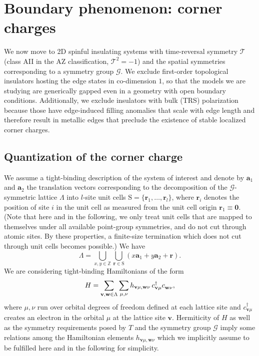 \section{Boundary phenomenon: corner charges}
\label{sec:corner-ch}
We now move to 2D spinful insulating systems with time-reversal symmetry $\mathcal{T}$ (class AII in the AZ classification, $\mathcal{T}^2 = -1$) and the spatial symmetries corresponding to a symmetry group $\mathcal{G}$. We exclude first-order topological insulators hosting the edge states in co-dimension $1$, so that the models we are studying are generically gapped even in a geometry with open boundary conditions. Additionally, we exclude insulators with bulk (TRS) polarization because those have edge-induced filling anomalies that scale with edge length and therefore result in metallic edges that preclude the existence of stable localized corner charges\cite{benalcazar2018quantization}.

\subsection{Quantization of the corner charge}
\label{sec:bdrychquant}
We assume a tight-binding description of the system of interest and denote by $\mathbf{a}_1$ and $\mathbf{a}_2$ the translation vectors corresponding to the decomposition of the $\mathcal{G}$-symmetric lattice $\Lambda$ into $l$-site unit cells $\mathrm{S} = \{\mathbf{r}_1, \dots, \mathbf{r}_l \}$, where $\mathbf{r}_i$ denotes the position of site $i$ in the unit cell as measured from the unit cell origin $\mathbf{r}_1 \equiv \mathbf{0}$. (Note that here and in the following, we only treat unit cells that are mapped to themselves under all available point-group symmetries, and do not cut through atomic sites. By these properties, a finite-size termination which does not cut through unit cells becomes possible.) We have
\begin{equation}
\Lambda = \bigcup_{x,y \in \mathbb{Z}} \bigcup_{\mathbf{r} \in \mathrm{S}} \left(x \mathbf{a}_1 + y \mathbf{a}_2 + \mathbf{r} \right).
\end{equation}
We are considering tight-binding Hamiltonians of the form
\begin{equation}
\label{eq:tbham}
H = \sum_{\mathbf{v}, \mathbf{w} \in \Lambda} \sum_{\mu,\nu} h_{\mathbf{v} \mu, \mathbf{w} \nu} \, c^\dagger_{\mathbf{v} \mu} c^{\vphantom{\dagger}}_{\mathbf{w} \nu},
\end{equation}
where $\mu,\nu$ run over orbital degrees of freedom defined at each lattice site and $c^\dagger_{\mathbf{v} \mu}$ creates an electron in the orbital $\mu$ at the lattice site $\mathbf{v}$. Hermiticity of $H$ as well as the symmetry requirements posed by $T$ and the symmetry group $\mathcal{G}$ imply some relations among the Hamiltonian elements $h_{\mathbf{v} \mu, \mathbf{w} \nu}$ which we implicitly assume to be fulfilled here and in the following for simplicity.

